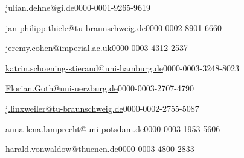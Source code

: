 


\author[1]{Julian Dehne}{julian.dehne@gi.de}{0000-0001-9265-9619}
\author[2]{Jan Philipp Thiele}{jan-philipp.thiele@tu-braunschweig.de}{0000-0002-8901-6660}
\author[3]{Jeremy Cohen}{jeremy.cohen@imperial.ac.uk}{0000-0003-4312-2537}
\author[4]{Katrin Schöning-Stierand}{\href{mailto:katrin.schoening-stierand@uni-hamburg.de}{katrin.schoening-stierand@uni-hamburg.de}}{0000-0003-3248-8023}
\author[5]{Florian Goth}{\href{mailto:Florian.Goth@uni-wuerzburg.de}{Florian.Goth@uni-uerzburg.de}}{0000-0003-2707-4790}
\author[6]{Jan Linxweiler}{\href{mailto:j.linxweiler@tu-braunschweig.de}{j.linxweiler@tu-braunschweig.de}}{0000-0002-2755-5087}
\author[7]{Anna-Lena Lamprecht}{\href{mailto:anna-lena.lamprecht@uni-potsdam.de}{anna-lena.lamprecht@uni-potsdam.de}}{0000-0003-1953-5606}
\author[8]{Harald von Waldow}{\href{mailto:harald.vonwaldow@thuenen.de}{harald.vonwaldow@thuenen.de}}{0000-0003-4800-2833}

